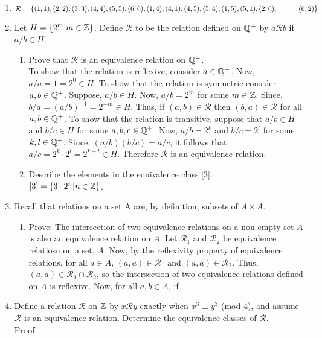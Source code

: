 \documentclass[12pt]{article}
\newcommand{\mc}[1]{\mathcal{#1}}
\begin{document}
\begin{enumerate}
        \item \(\mc R = \{(1,1), (2,2), (3,3), (4,4), (5,5), (6,6), (1,4), (4,1), (4,5), (5,4), (1,5), (5,1), (2,6),\\ ~~~~~~~~~ (6,2)\}\)
        \item Let \(H = \{2^m|m \in \mathbb{Z}\}\). Define \(\mc R\) to be the relation defined on \(\mathbb{Q}^+\) by \(a \mc R b\) if \(a/b \in H\). \begin{enumerate}
            \item Prove that \(\mc R\) is an equivalence relation on \(\mathbb{Q}^+\). \\
            To show that the relation is reflexive, consider \(a\in \mathbb{Q}^+\). Now, \(a/a = 1 = 2^0 \in H\). To show that the relation is symmetric consider \(a, b \in \mathbb{Q}^+\). Suppose, \(a/b\in H\). Now, \(a/b = 2^m\) for some \(m \in \mathbb{Z}\). Since, \(b/a = (a/b)^{-1} = 2^{-m} \in H\). Thus, if \((a,b)\in \mc R\) then \((b,a)\in \mc R\) for all \(a,b \in \mathbb{Q}^+\). To show that the relation is transitive, suppose that \(a/b \in H\) and \(b/c\in H\) for some \(a, b, c\in \mathbb{Q}^+\). Now, \(a/b = 2^k\) and \(b/c = 2^l\) for some \(k, l \in \mathbb{Q}^+\). Since, \((a/b)(b/c) = a/c\), it follows that \(a/c = 2^k\cdot2^l = 2^{k+l}\in H\). Therefore \(\mc R\) is an equivalence relation. 
            \item Describe the elements in the equivalence class [3]. \\ \(\mc [3] = \{3\cdot2^n|n\in \Z\}\). 
        \end{enumerate}
        \item Recall that relations on a set A are, by definition, subsets of \(A\times A\). \begin{enumerate}
            \item {\sc Prove:} The intersection of two equivalence relations on a non-empty set \(A\) is also an equivalence relation on \(A\). Let \(\mc{R}_1\) and \(\mc{R}_2\) be equivalence relatiosn on a set, \(A\). Now, by the reflexivity property of equivalence relations, for all \(a\in A\), \((a, a) \in \mc R_1\) and \((a, a) \in \mc R_2\). Thus, \((a, a)\in \mc R_1\cap \mc R_2\), so the intersection of two equivalence relations defined on \(A\) is reflexive. Now, for all \(a,b\in A\), if 
        \end{enumerate}
        \item Define a relation \(\mc R\) on \(\mathbb{Z}\) by \(x\mc Ry\) exactly when \(x^3 \equiv y^3 \) (mod 4), and assume \(\mc R\) is an equivalence relation. Determine the equivalence classes of \(\mc R\). \\ {\sc Proof:} 
    \end{enumerate}
\end{document}
